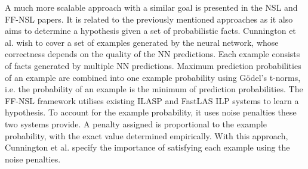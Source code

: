 A much more scalable approach with a similar goal is presented in the NSL \cite{RefWorks:RefID:80-cunnington2020nsl:} and FF-NSL \cite{RefWorks:RefID:71-cunnington2021ff-nsl:} papers.
It is related to the previously mentioned approaches as it also aims to determine a hypothesis given a set of probabilistic facts.
Cunnington et al. wish to cover a set of examples generated by the neural network, whose correctness depends on the quality of the NN predictions.
Each example consists of facts generated by multiple NN predictions.
Maximum prediction probabilities of an example are combined into one example probability using G\"{o}del's t-norms, i.e. the probability of an example is the minimum of prediction probabilities.
The FF-NSL framework utilises existing ILASP \cite{RefWorks:RefID:54-ilasp} and FastLAS \cite{RefWorks:RefID:19-law2020fastlas:} ILP systems to learn a hypothesis.
To account for the example probability, it uses noise penalties these two systems provide.
A penalty assigned is proportional to the example probability, with the exact value determined empirically.
With this approach, Cunnington et al. specify the importance of satisfying each example using the noise penalties.
